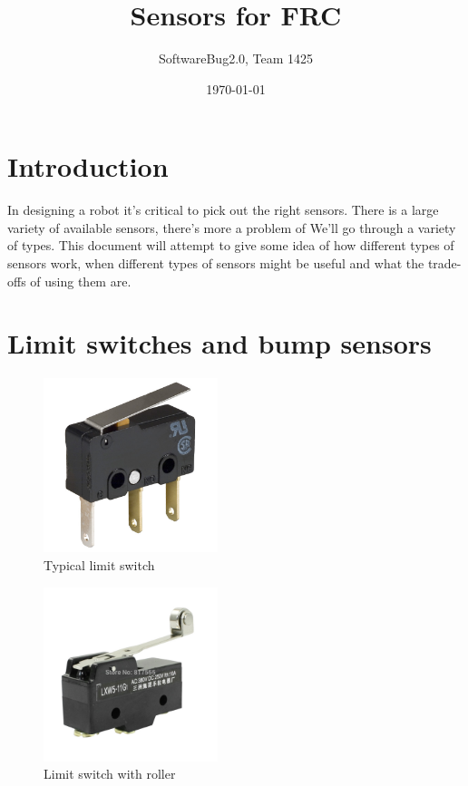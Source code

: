 \documentclass{article}
\begin{document}
\title{Sensors for FRC}

\author{SoftwareBug2.0, Team 1425}
\date{\today}

\maketitle

\tableofcontents

\section{Introduction}

In designing a robot it's critical to pick out the right sensors.  There is a large variety of available sensors, there's more a problem of We'll go through a variety of types.  This document will attempt to give some idea of how different types of sensors work, when different types of sensors might be useful and what the trade-offs of using them are.  


\section{Limit switches and bump sensors}

\begin{figure}[ht]
\centering
\includegraphics[width=2in]{Spdt_limit_switch.jpg}
\caption{Typical limit switch}
\end{figure}

\begin{figure}[ht]
\centering
\includegraphics[width=2in]{limit_wheel.jpg}
\caption{Limit switch with roller}
\end{figure}
\end{document}
